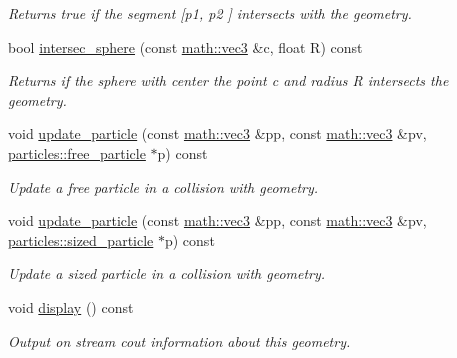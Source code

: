 \begin{DoxyCompactItemize}
\begin{DoxyCompactList}\small\item\em Returns true if the segment \mbox{[}{\itshape p1}, {\itshape p2} \mbox{]} intersects with the geometry. \end{DoxyCompactList}\item 
bool \hyperlink{classphysim_1_1geometry_1_1plane_a443ac157b8f8f92ed4516a63d181bc5b}{intersec\+\_\+sphere} (const \hyperlink{structphysim_1_1math_1_1vec3}{math\+::vec3} \&c, float R) const
\begin{DoxyCompactList}\small\item\em Returns if the sphere with center the point {\itshape c} and radius {\itshape R} intersects the geometry. \end{DoxyCompactList}\item 
void \hyperlink{classphysim_1_1geometry_1_1plane_aaa6388a8a8fc289fc15d417e31a2d7a2}{update\+\_\+particle} (const \hyperlink{structphysim_1_1math_1_1vec3}{math\+::vec3} \&pp, const \hyperlink{structphysim_1_1math_1_1vec3}{math\+::vec3} \&pv, \hyperlink{classphysim_1_1particles_1_1free__particle}{particles\+::free\+\_\+particle} $\ast$p) const
\begin{DoxyCompactList}\small\item\em Update a free particle in a collision with geometry. \end{DoxyCompactList}\item 
void \hyperlink{classphysim_1_1geometry_1_1plane_a9d72fc86446a0bcb46bfb344f40621ff}{update\+\_\+particle} (const \hyperlink{structphysim_1_1math_1_1vec3}{math\+::vec3} \&pp, const \hyperlink{structphysim_1_1math_1_1vec3}{math\+::vec3} \&pv, \hyperlink{classphysim_1_1particles_1_1sized__particle}{particles\+::sized\+\_\+particle} $\ast$p) const
\begin{DoxyCompactList}\small\item\em Update a sized particle in a collision with geometry. \end{DoxyCompactList}\item 
\mbox{\label{classphysim_1_1geometry_1_1plane_a87b635ce5a570898812cf9173378da69}} 
void \hyperlink{classphysim_1_1geometry_1_1plane_a87b635ce5a570898812cf9173378da69}{display} () const
\begin{DoxyCompactList}\small\item\em Output on stream {\itshape cout} information about this geometry. \end{DoxyCompactList}\end{DoxyCompactItemize}
